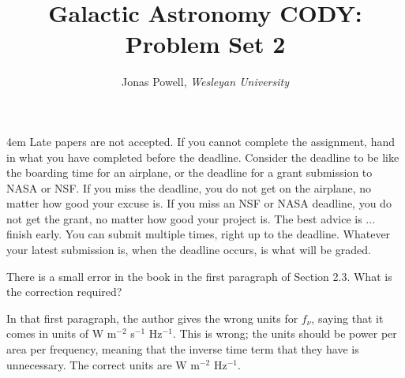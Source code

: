 \documentclass[12pt]{article}
\newenvironment{problem}[2][Problem]{\begin{trivlist}
\item[\hskip \labelsep {\bfseries #1}\hskip \labelsep {\bfseries #2.}]}{\end{trivlist}}
\newenvironment{answer}[2][Answer]{\begin{trivlist}
\item[\hskip \labelsep {\bfseries #1}\hskip \labelsep {\bfseries #2.}]}{\end{trivlist}}
\begin{document}



\title{\Large \textbf{Galactic Astronomy CODY: Problem Set 2}}

\author{{\rm Jonas Powell, \textit{Wesleyan University}}}


\maketitle


\begin{addmargin}[4em]{4em}
 Late papers are not accepted. If you cannot complete the assignment, hand in what you have completed before the deadline. Consider the deadline to be like the boarding time for an airplane, or the deadline for a grant submission to NASA or NSF. If you miss the deadline, you do not get on the airplane, no matter how good your excuse is. If you miss an NSF or NASA deadline, you do not get the grant, no matter how good your project is. The best advice is ... finish early. You can submit multiple times, right up to the deadline. Whatever your latest submission is, when the deadline occurs, is what will be graded.
\bigskip \bigskip
\end{addmargin}




\begin{problem}{1}
  There is a small error in the book in the first paragraph of Section 2.3. What is the correction required?
\end{problem}

\begin{answer}{1}
  In that first paragraph, the author gives the wrong units for $f_\nu$, saying that it comes in units of W m$^{-2}$ s$^{-1}$ Hz$^{-1}$. This is wrong; the units should be power per area per frequency, meaning that the inverse time term that they have is unnecessary. The correct units are W m$^{-2}$ Hz$^{-1}$.
\end{answer}
\end{document}
